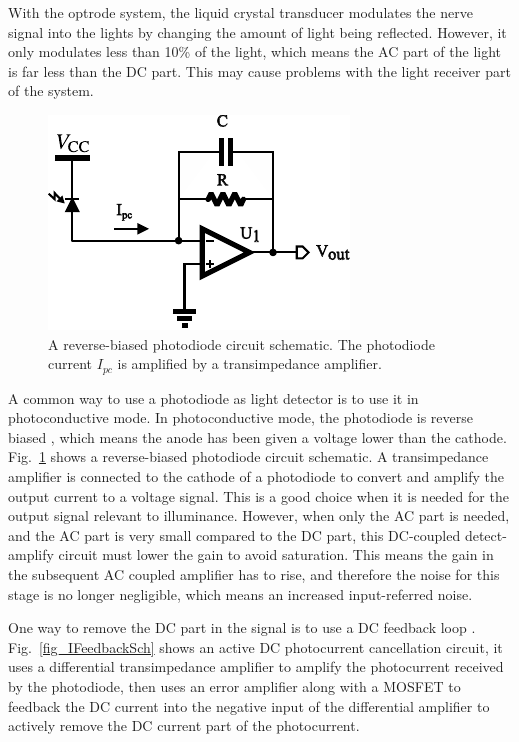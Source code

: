 With the optrode system, the liquid crystal transducer modulates the nerve signal into the lights by changing the amount of light being reflected.  However, it only modulates less than 10\% of the light, which means the AC part of the light is far less than the DC part.  This may cause problems with the light receiver part of the system.

\begin{figure}[h]
\centerline{\includegraphics[width=0.6\linewidth]{3-literature/ReverseBiasSch.pdf}}
\caption{A reverse-biased photodiode circuit schematic.  The photodiode current $I_{pc}$ is amplified by a transimpedance amplifier.}
\label{fig_ReverseBiasSch}
\end{figure}

A common way to use a photodiode as light detector is to use it in photoconductive mode.  In photoconductive mode, the photodiode is reverse biased \cite{PDbook}, which means the anode has been given a voltage lower than the cathode.  Fig.~\ref{fig_ReverseBiasSch} shows a reverse-biased photodiode circuit schematic.  A transimpedance amplifier is connected to the cathode of a photodiode to convert and amplify the output current to a voltage signal.  This is a good choice when it is needed for the output signal relevant to illuminance.  However, when only the AC part is needed, and the AC part is very small compared to the DC part, this DC-coupled detect-amplify circuit must lower the gain to avoid saturation.  This means the gain in the subsequent AC coupled amplifier has to rise, and therefore the noise for this stage is no longer negligible, which means an increased input-referred noise.

One way to remove the DC part in the signal is to use a DC feedback loop \cite{IOffsetTIA}.  Fig.~\ref{fig_IFeedbackSch} shows an active DC photocurrent cancellation circuit, it uses a differential transimpedance amplifier to amplify the photocurrent received by the photodiode, then uses an error amplifier along with a MOSFET to feedback the DC current into the negative input of the differential amplifier to actively remove the DC current part of the photocurrent.

